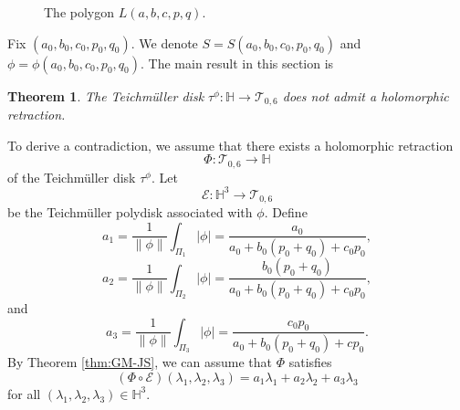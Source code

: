 \documentclass[11pt]{amsart}
\theoremstyle{plain}
\newtheorem{Theorem}{Theorem}[section]
\newcommand{\Tei}{\mathcal{T}}
\begin{document}
 
\begin{figure}[h]
    \centering
    \caption{The polygon $L(a,b,c,p,q)$.}
    \label{fig:L1}
\end{figure}


Fix $(a_0, b_0, c_0, p_0, q_0)$. We denote $S= S(a_0,b_0,c_0,p_0,q_0)$ and $\phi=\phi(a_0,b_0,c_0,p_0,q_0)$. 
The main result in this section is
 \begin{Theorem}\label{thm:typeA}
 The Teichm\"uller disk 
 $\tau^{\phi} : \mathbb{H} \to \Tei_{0,6}$ does not admit a holomorphic retraction.  
 \end{Theorem}


 To derive a contradiction, we assume that there exists a holomorphic retraction $$\Phi : \Tei_{0,6} \to \mathbb{H}$$ of the Teichm\"uller disk $\tau^{\phi}$. 
 Let $$\mathcal{E}:\mathbb{H}^3\rightarrow\Tei_{0,6}$$ be the Teichm\"uller polydisk associated with $\phi$. Define $$a_1=\frac{1}{{\|\phi\|}}\int_{\Pi_1}|\phi|=\frac{a_0}{a_0+b_0(p_0+q_0)+c_0p_0},$$
 $$a_2=\frac{1}{{\|\phi\|}}\int_{\Pi_2}|\phi|=\frac{b_0(p_0+q_0)}{a_0+b_0(p_0+q_0)+c_0p_0},$$ and
  $$ a_3=\frac{1}{{\|\phi\|}}\int_{\Pi_3}|\phi|=\frac{c_0p_0}{a_0+b_0(p_0+q_0)+cp_0}.$$
By Theorem \ref{thm:GM-JS}, we can assume that $\Phi$ satisfies  $$\left(\Phi\circ \mathcal{E}\right)(\lambda_1,\lambda_2,\lambda_3)=a_1\lambda_1+a_2\lambda_2+a_3\lambda_3$$
for all $(\lambda_1,\lambda_2,\lambda_3)\in \mathbb{H}^3$. 
\end{document}
